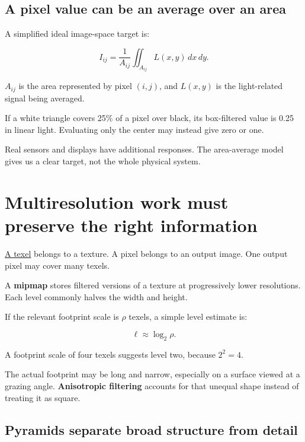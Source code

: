 \subsection{A pixel value can be an average over an area}\label{04-visual-computing-ii-ch043-a-pixel-value-can-be-an-average-over-an-area}

A simplified ideal image-space target is:

\[
I_{ij}=\frac1{A_{ij}}\iint_{A_{ij}}L(x,y)\,dx\,dy.
\]

\(A_{ij}\) is the area represented by pixel \((i,j)\), and \(L(x,y)\) is the light-related signal being averaged.

If a white triangle covers 25\% of a pixel over black, its box-filtered value is 0.25 in linear light. Evaluating only the center may instead give zero or one.

Real sensors and displays have additional responses. The area-average model gives us a clear target, not the whole physical system.

\section{Multiresolution work must preserve the right information}\label{04-visual-computing-ii-ch043-multiresolution-work-must-preserve-the-right-information}

\hyperref[appendix-b677a85ba76f]{A texel} belongs to a texture. A pixel belongs to an output image. One output pixel may cover many texels.

A \textbf{mipmap} stores filtered versions of a texture at progressively lower resolutions. Each level commonly halves the width and height.

If the relevant footprint scale is \(\rho\) texels, a simple level estimate is:

\[
\ell\approx\log_2\rho.
\]

A footprint scale of four texels suggests level two, because \(2^2=4\).

The actual footprint may be long and narrow, especially on a surface viewed at a grazing angle. \textbf{Anisotropic filtering} accounts for that unequal shape instead of treating it as square.

\subsection{Pyramids separate broad structure from detail}\label{04-visual-computing-ii-ch043-pyramids-separate-broad-structure-from-detail}

